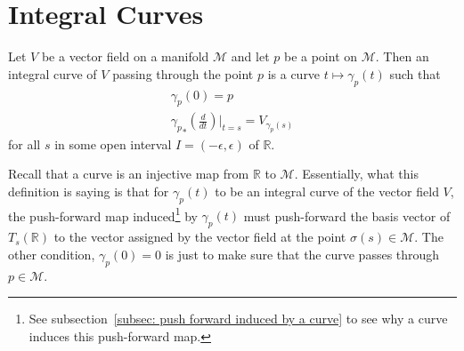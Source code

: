   \section{Integral Curves}
    \label{sec: integral curves}
    \begin{definition}
      \label{defn: integral curve defn}
      Let $V$ be a vector field on a manifold $\mathcal{M}$ and let $p$ be a point on $\mathcal{M}$. Then an integral curve of $V$ passing through the point $p$ is a curve $t \mapsto \gamma_p(t)$ such that
      \begin{subequations}
        \begin{gather}
          \gamma_p(0) = p \\
          {\gamma_{p}}_{*} \left(\frac{d}{dt}\right)\biggr|_{t = s} =
          V_{\gamma_p(s)} \label{eqn: integral curve push forward eqn}
        \end{gather}
      \end{subequations}
      for all $s$ in some open interval $I = (-\epsilon, \epsilon)$ of $\mathbb{R}$.
    \end{definition}
    \begin{remark}
      Recall that a curve is an injective map from $\mathbb{R}$ to
      $\mathcal{M}$. Essentially, what this definition is saying is that for
      $\gamma_p(t)$ to be an integral curve of the vector field $V$, the
      push-forward map induced\footnote{See subsection~\ref{subsec:
      push forward induced by a curve} to see why a curve induces this
      push-forward map.} by $\gamma_p(t)$ must push-forward the basis
      vector of $T_s(\mathbb{R})$ to the vector assigned by the vector
      field at the point $\sigma(s) \in \mathcal{M}$. The other condition,
      $\gamma_p(0) = 0$ is just to make sure that the curve passes through
      $p \in \mathcal{M}$.
    \end{remark}
